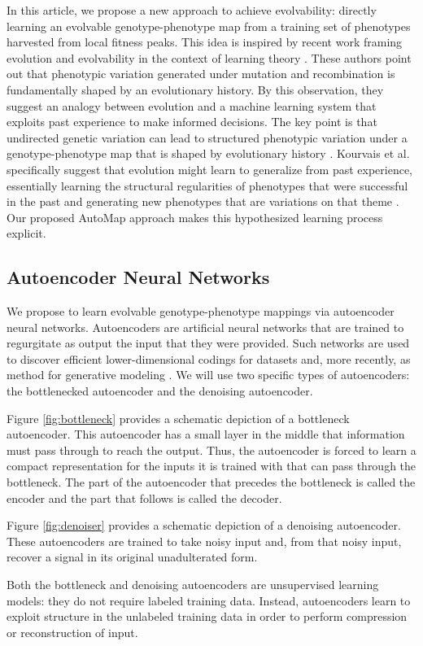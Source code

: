 In this article, we propose a new approach to achieve evolvability: directly learning an evolvable genotype-phenotype map from a training set of phenotypes harvested from local fitness peaks.
This idea is inspired by recent work framing evolution and evolvability in the context of learning theory \cite{kouvaris2017evolution, watson2016can}.
These authors point out that phenotypic variation generated under mutation and recombination is fundamentally shaped by an evolutionary history.
By this observation, they suggest an analogy between evolution and a machine learning system that exploits past experience to make informed decisions.
The key point is that undirected genetic variation can lead to structured phenotypic variation under a genotype-phenotype map that is shaped by evolutionary history \cite{watson2016can}.
Kourvais et al. specifically suggest that evolution might learn to generalize from past experience, essentially learning the structural regularities of phenotypes that were successful in the past and generating new phenotypes that are variations on that theme \cite{kouvaris2017evolution}.
Our proposed AutoMap approach makes this hypothesized learning process explicit.

\subsection{Autoencoder Neural Networks}

We propose to learn evolvable genotype-phenotype mappings via autoencoder neural networks.
Autoencoders are artificial neural networks that are trained to regurgitate as output the input that they were provided.
Such networks are used to discover efficient lower-dimensional codings for datasets and, more recently, as method for generative modeling \cite{liou2014autoencoder, kingma2013auto}.
We will use two specific types of autoencoders: the bottlenecked autoencoder and the denoising autoencoder.



Figure \ref{fig:bottleneck} provides a schematic depiction of a bottleneck autoencoder.
This autoencoder has a small layer in the middle that information must pass through to reach the output.
Thus, the autoencoder is forced to learn a compact representation for the inputs it is trained with that can pass through the bottleneck.
The part of the autoencoder that precedes the bottleneck is called the encoder and the part that follows is called the decoder.

Figure \ref{fig:denoiser} provides a schematic depiction of a denoising autoencoder.
These autoencoders are trained to take noisy input and, from that noisy input, recover a signal in its original unadulterated form.

Both the bottleneck and denoising autoencoders are unsupervised learning models: they do not require labeled training data.
Instead, autoencoders learn to exploit structure in the unlabeled training data in order to perform compression or reconstruction of input.
